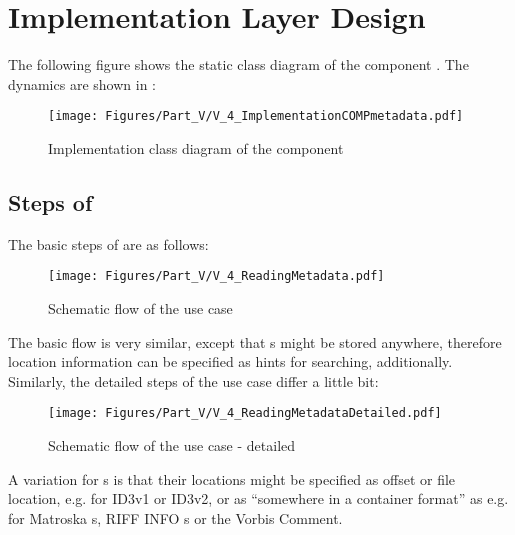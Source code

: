 \section{Implementation Layer Design}
\label{sec:ImplementationDesignCOMPmetadata}

The following figure shows the static class diagram of the component \COMPmetadata{}. The dynamics are shown in :

\begin{figure}[H]
	\centering
	\texttt{[image: Figures/Part\_V/V\_4\_ImplementationCOMPmetadata.pdf]}
	\caption{Implementation class diagram of the component \COMPmetadata{}}
	\label{fig:V_4_ImplementationCOMPmetadata}
\end{figure}



\subsection{Steps of \UCreadMetadata{}}
\label{sec:StepsOfUCreadMetadata}

The basic steps of \UCreadMetadata{} are as follows:

\begin{figure}[H]
	\centering
	\texttt{[image: Figures/Part\_V/V\_4\_ReadingMetadata.pdf]}
	\caption{Schematic flow of the use case \UCreadMetadata{}}
	\label{fig:V_4_ReadingMetadata.pdf}
\end{figure}

The basic flow is very similar, except that \TERMtag{}s might be stored anywhere, therefore location information can be specified as hints for searching, additionally. Similarly, the detailed steps of the use case differ a little bit:

\begin{figure}[H]
	\centering
	\texttt{[image: Figures/Part\_V/V\_4\_ReadingMetadataDetailed.pdf]}
	\caption{Schematic flow of the use case \UCreadMetadata{} - detailed}
	\label{fig:V_4_ReadingMetadataDetailed.pdf}
\end{figure}

A variation for \TERMtag{}s is that their locations might be specified as offset or file location, e.g. for ID3v1 or ID3v2, or as ``somewhere in a container format'' as e.g. for Matroska \TERMtag{}s, RIFF INFO \TERMtag{}s or the Vorbis Comment.

